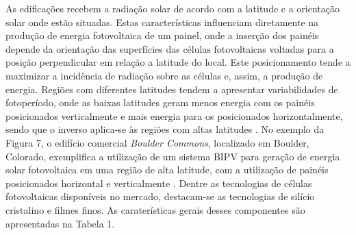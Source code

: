 \begin{onehalfspace}
    \noindent As edificações recebem a radiação solar de acordo com a latitude e a orientação solar onde estão situadas. 
    Estas características influenciam diretamente na produção de energia fotovoltaica de um painel, onde a 
    inserção dos painéis depende da orientação das superfícies das células fotovoltaicas voltadas para a posição 
    perpendicular em relação a latitude do local. Este posicionamento tende a maximizar a incidência de radiação 
    sobre as células e, assim, a produção de energia. Regiões com diferentes latitudes tendem a apresentar 
    variabilidades de fotoperíodo, onde as baixas latitudes geram menos energia com os painéis posicionados 
    verticalmente e mais energia para os posicionados horizontalmente, sendo que o inverso aplica-se às regiões 
    com altas latitudes \cite{Pereira2017}.\vspace{0.3cm} \newline
    No exemplo da Figura 7, o edifício comercial \textit{Boulder Commons}, localizado em Boulder, Colorado, 
    exemplifica a utilização de um sistema BIPV para geração de energia solar fotovoltaica em uma região de 
    alta latitude, com a utilização de painéis posicionados horizontal e verticalmente \cite{AmericanSocietyofHeatingRefrigeratingandAir-ConditioningEngineers-ASHRAE2019,Pereira2017}.
    Dentre as tecnologias de células fotovoltaicas disponíveis no mercado, destacam-se as tecnologias de 
    silício cristalino e filmes finos. As caraterísticas gerais desses componentes são apresentadas na Tabela 1.


        

\end{onehalfspace}